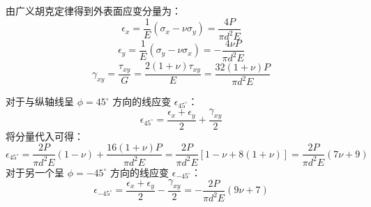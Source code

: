 \documentclass[11pt,a4paper]{ctexrep}
\begin{document}
{由广义胡克定律得到外表面应变分量为：
\[
\epsilon_x = \frac{1}{E} (\sigma_x - \nu \sigma_y) = \frac{4P}{\pi d^2 E}
\]
\[
\epsilon_y = \frac{1}{E} (\sigma_y - \nu \sigma_x) = -\frac{4\nu P}{\pi d^2 E}
\]
\[
\gamma_{xy} = \frac{\tau_{xy}}{G} = \frac{2(1+\nu)\tau_{xy}}{E} = \frac{32(1+\nu)P}{\pi d^2 E}
\]

对于与纵轴线呈 $\phi = 45^\circ$ 方向的线应变 $\epsilon_{45^\circ}$：
\[
\epsilon_{45^\circ} = \frac{\epsilon_x + \epsilon_y}{2} + \frac{\gamma_{xy}}{2}
\]
将分量代入可得：
\[
\epsilon_{45^\circ} = \frac{2P}{\pi d^2 E} (1 - \nu) + \frac{16(1+\nu)P}{\pi d^2 E} = \frac{2P}{\pi d^2 E} \left[ 1 - \nu + 8(1 + \nu) \right] = \frac{2P}{\pi d^2 E} (7\nu + 9)
\]
对于另一个呈 $\phi = -45^\circ$ 方向的线应变 $\epsilon_{-45^\circ}$：
\[
\epsilon_{-45^\circ} = \frac{\epsilon_x + \epsilon_y}{2} - \frac{\gamma_{xy}}{2} = -\frac{2P}{\pi d^2 E} (9\nu + 7)
\]


}
\end{document}
